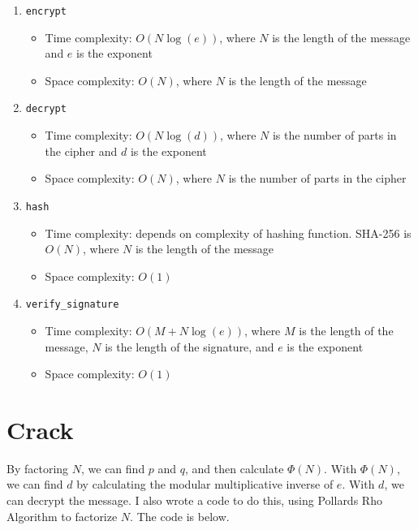 \documentclass[a4paper]{article}
\begin{document}
\begin{enumerate}
    \item \texttt{encrypt}
        \begin{itemize}
            \item Time complexity: \( O(N \log(e)) \), where \( N \) is the length of the message and \( e \) is the exponent
            \item Space complexity: \( O(N) \), where \( N \) is the length of the message
        \end{itemize}

    \item \texttt{decrypt}
        \begin{itemize}
            \item Time complexity: \( O(N \log(d)) \), where \( N \) is the number of parts in the cipher and \( d \) is the exponent
            \item Space complexity: \( O(N) \), where \( N \) is the number of parts in the cipher
        \end{itemize}
    
    \item \texttt{hash}
        \begin{itemize}
            \item Time complexity: depends on complexity of hashing function. SHA-256 is \( O(N) \), where \( N \) is the length of the message
            \item Space complexity: \( O(1) \)
        \end{itemize}

    \item \texttt{verify\_signature}
        \begin{itemize}
            \item Time complexity: \( O(M + N \log(e)) \), where \( M \) is the length of the message, \( N \) is the length of the signature, and \( e \) is the exponent
            \item Space complexity: \( O(1) \)
        \end{itemize}
\end{enumerate}
\section{Crack}
By factoring \( N \), we can find \( p \) and \( q \), and then calculate \( \Phi(N) \). With \( \Phi(N) \), we can find \( d \) by calculating the modular multiplicative inverse of \( e \). With \( d \), we can decrypt the message. I also wrote a code to do this, using Pollards Rho Algorithm to factorize \( N \). The code is below.

\end{document}
